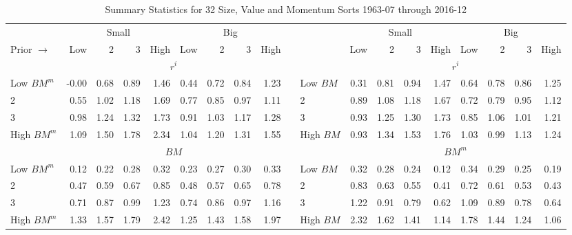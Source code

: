 
\begin{table}[ht]
\small
\centering
\caption{Summary Statistics for 32 Size, Value and Momentum Sorts 1963-07 through 2016-12}
\begin{tabular}{lrrrrrrrrllrrrrrrrr}
  \toprule
    & \multicolumn{4}{c}{Small} & \multicolumn{4}{c}{Big} & & & \multicolumn{4}{c}{Small} & \multicolumn{4}{c}{Big} \\
      \cmidrule(r){2-5} \cmidrule(r){6-9} \cmidrule(r){12-15} \cmidrule(r){16-19}
  Prior $\rightarrow$ & Low & 2 & 3 & High & Low & 2 & 3 & High & & & Low & 2 & 3 & High & Low & 2 & 3 & High \\
  \midrule

                 & \multicolumn{8}{c}{$r^i$}                                             & &             & \multicolumn{8}{c}{$r^i$} \\
    Low $BM^m$   & -0.00  &  0.68  &  0.89  &  1.46  &  0.44  &  0.72  &  0.84  &  1.23  & &  Low $BM$   &  0.31  &  0.81  &  0.94  &  1.47  &  0.64  &  0.78  &  0.86  &  1.25  \\
             2   &  0.55  &  1.02  &  1.18  &  1.69  &  0.77  &  0.85  &  0.97  &  1.11  & &         2   &  0.89  &  1.08  &  1.18  &  1.67  &  0.72  &  0.79  &  0.95  &  1.12  \\
             3   &  0.98  &  1.24  &  1.32  &  1.73  &  0.91  &  1.03  &  1.17  &  1.28  & &         3   &  0.93  &  1.25  &  1.30  &  1.73  &  0.85  &  1.06  &  1.01  &  1.21  \\
    High $BM^m$  &  1.09  &  1.50  &  1.78  &  2.34  &  1.04  &  1.20  &  1.31  &  1.55  & &  High $BM$  &  0.93  &  1.34  &  1.53  &  1.76  &  1.03  &  0.99  &  1.13  &  1.24  \\
    [1em]

                 & \multicolumn{8}{c}{$BM$}                                              & &             & \multicolumn{8}{c}{$BM^m$} \\ 
    Low $BM^m$   &  0.12  &  0.22  &  0.28  &  0.32  &  0.23  &  0.27  &  0.30  &  0.33  & &  Low $BM$   &  0.32  &  0.28  &  0.24  &  0.12  &  0.34  &  0.29  &  0.25  &  0.19  \\
             2   &  0.47  &  0.59  &  0.67  &  0.85  &  0.48  &  0.57  &  0.65  &  0.78  & &         2   &  0.83  &  0.63  &  0.55  &  0.41  &  0.72  &  0.61  &  0.53  &  0.43  \\
             3   &  0.71  &  0.87  &  0.99  &  1.23  &  0.74  &  0.86  &  0.97  &  1.16  & &         3   &  1.22  &  0.91  &  0.79  &  0.62  &  1.09  &  0.89  &  0.78  &  0.64  \\
    High $BM^m$  &  1.33  &  1.57  &  1.79  &  2.42  &  1.25  &  1.43  &  1.58  &  1.97  & &  High $BM$  &  2.32  &  1.62  &  1.41  &  1.14  &  1.78  &  1.44  &  1.24  &  1.06  \\
    [1em]
  


\end{tabular}
\end{table}
